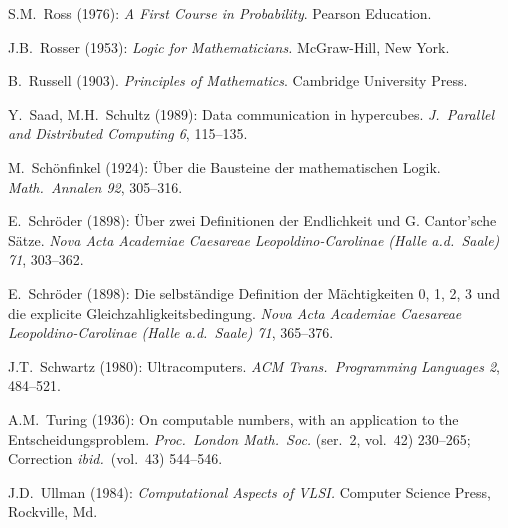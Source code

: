 \begin{thebibliography}{999}
S.M.~Ross (1976):
{\it A First Course in Probability}.
Pearson Education.

J.B.~Rosser (1953):
{\it Logic for Mathematicians.}
McGraw-Hill, New York.

B.~Russell (1903).  {\it Principles of Mathematics}.
Cambridge University Press. 



Y.~Saad, M.H.~Schultz (1989):
Data communication in hypercubes.
{\it J.~Parallel and Distributed Computing 6}, 115--135.

M.~Sch\"onfinkel (1924): \"{U}ber die Bausteine der mathematischen
Logik.  {\it Math.~Annalen 92}, 305--316.

E.~Schr\"{o}der (1898): \"{U}ber zwei Definitionen der Endlichkeit und
G. Cantor'sche S\"{a}tze.  {\it Nova Acta Academiae Caesareae
Leopoldino-Carolinae (Halle a.d.~Saale) 71}, 303--362.

E.~Schr\"{o}der (1898): Die selbst\"{a}ndige Definition der
M\"{a}chtigkeiten 0, 1, 2, 3 und die explicite
Gleichzahligkeitsbedingung.  {\it Nova Acta Academiae Caesareae
Leopoldino-Carolinae (Halle a.d.~Saale) 71}, 365--376.

J.T.~Schwartz (1980):
Ultracomputers.
{\it ACM Trans.~Programming Languages 2}, 484--521.



A.M.~Turing (1936): On computable numbers, with an application to the
Entscheidungsproblem.  {\it Proc.~London Math.~Soc.} (ser.~2, vol.~42)
230--265; Correction {\it ibid.}~(vol.~43) 544--546.


J.D.~Ullman (1984):
{\it Computational Aspects of VLSI.}
Computer Science Press, Rockville, Md.






\end{thebibliography}
